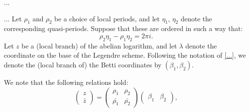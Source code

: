 ...

%	



...
Let $\rho_1$ and $\rho_2$ be a choice of local periods, and let $\eta_1$, $\eta_2$ denote the corresponding quasi-periods. Suppose that these are ordered in such a way that:
\[
\rho_2\eta_1-\rho_1\eta_2=2\pi i.
\]
Let $z$ be a (local branch) of the abelian logarithm, and let $\lambda$ denote the coordinate on the base of the Legendre scheme. Following the notation of \ref{...}, we denote the (local branch of) the Betti coordinates by $(\beta_1,\beta_2)$.

We note that the following relations hold:
\[
\begin{pmatrix}
z \\ \bar{z}
\end{pmatrix}
=
\begin{pmatrix}
\rho_1 & \rho_2 \\
\bar{\rho_1} & \bar{\rho_2}
\end{pmatrix}
\begin{pmatrix}
\beta_1 & \beta_2
\end{pmatrix},
\]

